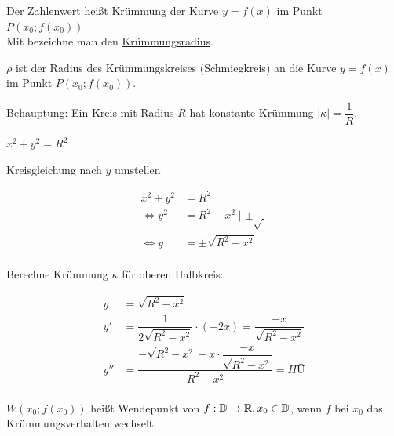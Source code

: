 
\Def Der Zahlenwert  heißt \ul{Krümmung} der Kurve $y=f(x)$ im Punkt $P(x_0;f(x_0))$\\
Mit  bezeichne man den \ul{Krümmungsradius}.

\Bem $\rho$ ist der Radius des Krümmungskreises (Schmiegkreis) an die Kurve $y=f(x)$ im Punkt $P(x_0;f(x_0))$.

\Bsp Behauptung: Ein Kreis mit Radius $R$ hat konstante Krümmung $|\kappa|=\dfrac{1}{R}$.

$x^2+y^2=R^2$

Kreisgleichung nach $y$ umstellen

\begin{align*}
x^2+y^2 &= R^2\\
\Leftrightarrow y^2 &= R^2-x^2\mid\pm\sqrt{\ }\\
\Leftrightarrow y &= \pm\sqrt{R^2-x^2}\\
\end{align*}

Berechne Krümmung $\kappa$ für oberen Halbkreis:

\begin{align*}
y &= \sqrt{R^2-x^2}\\
y' &= \dfrac{1}{2\sqrt{R^2-x^2}}\cdot(-2x) = \dfrac{-x}{\sqrt{R^2-x^2}}\\
y'' &= \dfrac{-\sqrt{R^2-x^2}+x\cdot\dfrac{-x}{\sqrt{R^2-x^2}}}{R^2-x^2} =  HÜ\\
\end{align*}

\Def $W(x_0;f(x_0))$ heißt Wendepunkt von $f:\mathbb{D}\to\mathbb{R},x_0\in\mathbb{D}$, wenn $f$ bei $x_0$ das Krümmungsverhalten wechselt.

